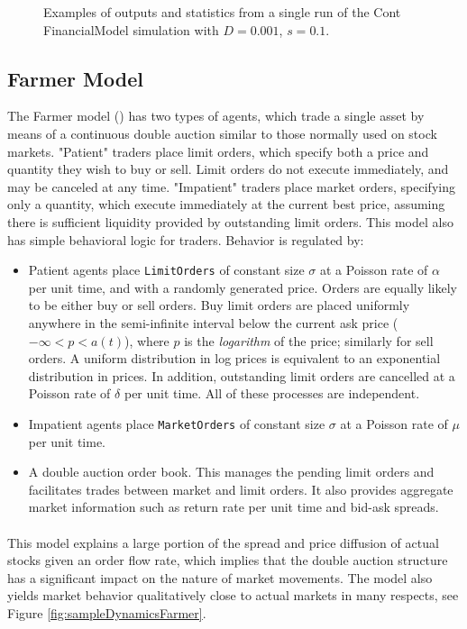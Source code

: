 \documentclass[runningheads]{llncs}
\begin{document}
\begin{figure}[htbp]
\begin{center}
{      }
    \caption{Examples of outputs and statistics from a single run of the Cont FinancialModel simulation with $D=0.001$, $s=0.1$.}
    \label{fig:ContLargeSSim}
  \end{center}
\end{figure}


\subsection{Farmer Model}

The Farmer model (\cite{farmer2003}) has two types of agents, which trade a single asset by means of a continuous double auction similar to those normally used on stock markets. "Patient" traders place limit orders, which specify both a price and quantity they wish to buy or sell. Limit orders do not execute immediately, and may be canceled at any time. "Impatient" traders place market orders, specifying only a quantity, which execute immediately at the current best price, assuming there is sufficient liquidity provided by outstanding limit orders. This model also has simple behavioral logic for traders. Behavior is regulated by:
\begin{itemize}
\item Patient agents place \texttt{LimitOrders} of constant size $\sigma$ at a Poisson rate of $\alpha$ per unit time, and with a randomly generated price. Orders are equally likely to be either buy or sell orders. Buy limit orders are placed uniformly anywhere in the semi-infinite interval below the current ask price ($-\infty < p < a(t)$), where $p$ is the \emph{logarithm} of the price; similarly for sell orders. A uniform distribution in log prices is equivalent to an exponential distribution in prices. In addition, outstanding limit orders are cancelled at a Poisson rate of $\delta$ per unit time. All of these processes are independent.
\item Impatient agents place \texttt{MarketOrders} of constant size $\sigma$ at a Poisson rate of $\mu$ per unit time.
\item A double auction order book. This manages the pending limit orders and facilitates trades between market and limit orders. It also provides aggregate market information such as return rate per unit time and bid-ask spreads.
\end{itemize}
\paragraph*{}
This model explains a large portion of the spread and price diffusion of actual stocks given an order flow rate, which implies that the double auction structure has a significant impact on the nature of market movements. The model also yields market behavior qualitatively close to actual markets in many respects, see Figure \ref{fig:sampleDynamicsFarmer}.
\end{document}

